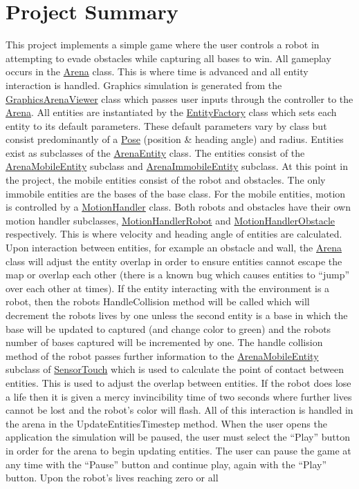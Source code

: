 \hypertarget{index_intro_sec}{}\section{Project Summary}\label{index_intro_sec}
This project implements a simple game where the user controls a robot in attempting to evade obstacles while capturing all bases to win. All gameplay occurs in the \hyperlink{classArena}{Arena} class. This is where time is advanced and all entity interaction is handled. Graphics simulation is generated from the \hyperlink{classGraphicsArenaViewer}{Graphics\+Arena\+Viewer} class which passes user inputs through the controller to the \hyperlink{classArena}{Arena}. All entities are instantiated by the \hyperlink{classEntityFactory}{Entity\+Factory} class which sets each entity to its default parameters. These default parameters vary by class but consist predominantly of a \hyperlink{structPose}{Pose} (position \& heading angle) and radius. Entities exist as subclasses of the \hyperlink{classArenaEntity}{Arena\+Entity} class. The entities consist of the \hyperlink{classArenaMobileEntity}{Arena\+Mobile\+Entity} subclass and \hyperlink{classArenaImmobileEntity}{Arena\+Immobile\+Entity} subclass. At this point in the project, the mobile entities consist of the robot and obstacles. The only immobile entities are the bases of the base class. For the mobile entities, motion is controlled by a \hyperlink{classMotionHandler}{Motion\+Handler} class. Both robots and obstacles have their own motion handler subclasses, \hyperlink{classMotionHandlerRobot}{Motion\+Handler\+Robot} and \hyperlink{classMotionHandlerObstacle}{Motion\+Handler\+Obstacle} respectively. This is where velocity and heading angle of entities are calculated. Upon interaction between entities, for example an obstacle and wall, the \hyperlink{classArena}{Arena} class will adjust the entity overlap in order to ensure entities cannot escape the map or overlap each other (there is a known bug which causes entities to “jump” over each other at times). If the entity interacting with the environment is a robot, then the robots Handle\+Collision method will be called which will decrement the robots lives by one unless the second entity is a base in which the base will be updated to captured (and change color to green) and the robots number of bases captured will be incremented by one. The handle collision method of the robot passes further information to the \hyperlink{classArenaMobileEntity}{Arena\+Mobile\+Entity} subclass of \hyperlink{classSensorTouch}{Sensor\+Touch} which is used to calculate the point of contact between entities. This is used to adjust the overlap between entities. If the robot does lose a life then it is given a mercy invincibility time of two seconds where further lives cannot be lost and the robot’s color will flash. All of this interaction is handled in the arena in the Update\+Entities\+Timestep method. When the user opens the application the simulation will be paused, the user must select the “\+Play” button in order for the arena to begin updating entities. The user can pause the game at any time with the “\+Pause” button and continue play, again with the “\+Play” button. Upon the robot’s lives reaching zero or all 